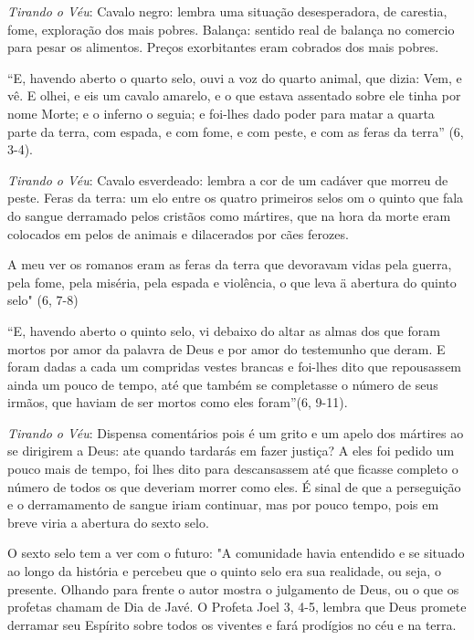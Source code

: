 \documentclass[
]{book}
\begin{document}
\emph{Tirando o Véu}: Cavalo negro: lembra uma situação desesperadora, de carestia, fome, exploração dos mais pobres. Balança: sentido real de balança no comercio para pesar os alimentos. Preços exorbitantes eram cobrados dos mais pobres.

``E, havendo aberto o quarto selo, ouvi a voz do quarto animal, que dizia: Vem, e vê. E olhei, e eis um cavalo amarelo, e o que estava assentado sobre ele tinha por nome Morte; e o inferno o seguia; e foi-lhes dado poder para matar a quarta parte da terra, com espada, e com fome, e com peste, e com as feras da terra'' (6, 3-4).

\emph{Tirando o Véu}: Cavalo esverdeado: lembra a cor de um cadáver que morreu de peste. Feras da terra: um elo entre os quatro primeiros selos om o quinto que fala do sangue derramado pelos cristãos como mártires, que na hora da morte eram colocados em pelos de animais e dilacerados por cães ferozes.

A meu ver os romanos eram as feras da terra que devoravam vidas pela guerra, pela fome, pela miséria, pela espada e violência, o que leva ä abertura do quinto selo" (6, 7-8)

``E, havendo aberto o quinto selo, vi debaixo do altar as almas dos que foram mortos por amor da palavra de Deus e por amor do testemunho que deram. E foram dadas a cada um compridas vestes brancas e foi-lhes dito que repousassem ainda um pouco de tempo, até que também se completasse o número de seus irmãos, que haviam de ser mortos como eles foram''(6, 9-11).

\emph{Tirando o Véu}: Dispensa comentários pois é um grito e um apelo dos mártires ao se dirigirem a Deus: ate quando tardarás em fazer justiça? A eles foi pedido um pouco mais de tempo, foi lhes dito para descansassem até que ficasse completo o número de todos os que deveriam morrer como eles. É sinal de que a perseguição e o derramamento de sangue iriam continuar, mas por pouco tempo, pois em breve viria a abertura do sexto selo.

O sexto selo tem a ver com o futuro: "A comunidade havia entendido e se situado ao longo da história e percebeu que o quinto selo era sua realidade, ou seja, o presente. Olhando para frente o autor mostra o julgamento de Deus, ou o que os profetas chamam de Dia de Javé. O Profeta Joel 3, 4-5, lembra que Deus promete derramar seu Espírito sobre todos os viventes e fará prodígios no céu e na terra.
\end{document}
